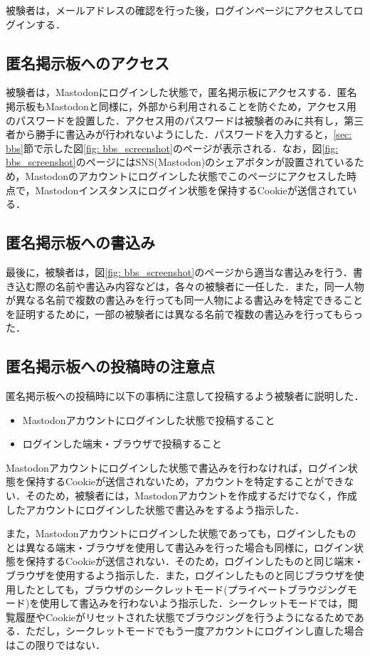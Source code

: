 \documentclass[10pt, a4paper]{jreport}
\begin{document}
被験者は，メールアドレスの確認を行った後，ログインページにアクセスしてログインする．

\subsection{匿名掲示板へのアクセス}
被験者は，Mastodonにログインした状態で，匿名掲示板にアクセスする．匿名掲示板もMastodonと同様に，外部から利用されることを防ぐため，アクセス用のパスワードを設置した．アクセス用のパスワードは被験者のみに共有し，第三者から勝手に書込みが行われないようにした．パスワードを入力すると，\ref{sec: bbs}節で示した図\ref{fig: bbs_screenshot}のページが表示される．なお，図\ref{fig: bbs_screenshot}のページにはSNS(Mastodon)のシェアボタンが設置されているため，Mastodonのアカウントにログインした状態でこのページにアクセスした時点で，Mastodonインスタンスにログイン状態を保持するCookieが送信されている．

\subsection{匿名掲示板への書込み}
最後に，被験者は，図\ref{fig: bbs_screenshot}のページから適当な書込みを行う．書き込む際の名前や書込み内容などは，各々の被験者に一任した．また，同一人物が異なる名前で複数の書込みを行っても同一人物による書込みを特定できることを証明するために，一部の被験者には異なる名前で複数の書込みを行ってもらった．

\subsection{匿名掲示板への投稿時の注意点}
匿名掲示板への投稿時に以下の事柄に注意して投稿するよう被験者に説明した．

\begin{itemize}
\item{Mastodonアカウントにログインした状態で投稿すること}
\item{ログインした端末・ブラウザで投稿すること}
\end{itemize}

Mastodonアカウントにログインした状態で書込みを行わなければ，ログイン状態を保持するCookieが送信されないため，アカウントを特定することができない．そのため，被験者には，Mastodonアカウントを作成するだけでなく，作成したアカウントにログインした状態で書込みをするよう指示した．

また，Mastodonアカウントにログインした状態であっても，ログインしたものとは異なる端末・ブラウザを使用して書込みを行った場合も同様に，ログイン状態を保持するCookieが送信されない．そのため，ログインしたものと同じ端末・ブラウザを使用するよう指示した．また，ログインしたものと同じブラウザを使用したとしても，ブラウザのシークレットモード(プライベートブラウジングモード)を使用して書込みを行わないよう指示した．シークレットモードでは，閲覧履歴やCookieがリセットされた状態でブラウジングを行うようになるためである．ただし，シークレットモードでもう一度アカウントにログインし直した場合はこの限りではない．
\end{document}
